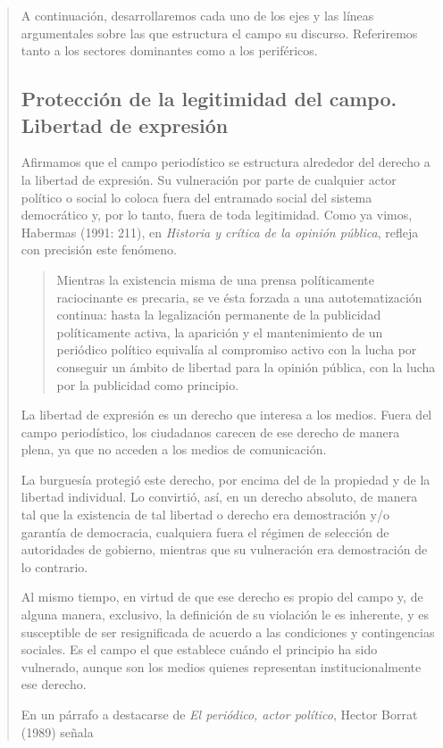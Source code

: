 \begin{quote}
A continuación, desarrollaremos cada uno de los ejes y las líneas argumentales sobre las que estructura el campo su discurso. Referiremos tanto a los sectores dominantes como a los periféricos.

\subsection {Protección de la legitimidad del campo. Libertad de expresión}

Afirmamos que el campo periodístico se estructura alrededor del derecho a la libertad de expresión. Su vulneración por parte de cualquier actor político o social lo coloca fuera del entramado social del sistema democrático y, por lo tanto, fuera de toda legitimidad. Como ya vimos, Habermas (1991: 211), en \emph{Historia y crítica de la opinión pública}, refleja con precisión este fenómeno.

\begin{quote}
	Mientras la existencia misma de una prensa políticamente raciocinante es precaria, se ve ésta forzada a una autotematización continua: hasta la legalización permanente de la publicidad políticamente activa, la aparición y el mantenimiento de un periódico político equivalía al compromiso activo con la lucha por conseguir un ámbito de libertad para la opinión pública, con la lucha por la publicidad como principio.
\end{quote}


La libertad de expresión es un derecho que interesa a los medios. Fuera del campo periodístico, los ciudadanos carecen de ese derecho de manera plena, ya que no acceden a los medios de comunicación.

La burguesía protegió este derecho, por encima del de la propiedad y de la libertad individual. Lo convirtió, así, en un derecho absoluto, de manera tal que la existencia de tal libertad o derecho era demostración y/o garantía de democracia, cualquiera fuera el régimen de selección de autoridades de gobierno, mientras que su vulneración era demostración de lo contrario.

Al mismo tiempo, en virtud de que ese derecho es propio del campo y, de alguna manera, exclusivo, la definición de su violación le es inherente, y es susceptible de ser resignificada de acuerdo a las condiciones y contingencias sociales. Es el campo el que establece cuándo el principio ha sido vulnerado, aunque son los medios quienes representan institucionalmente ese derecho.

En un párrafo a destacarse de \emph{El periódico, actor político}, Hector Borrat (1989) señala


\end{quote}
